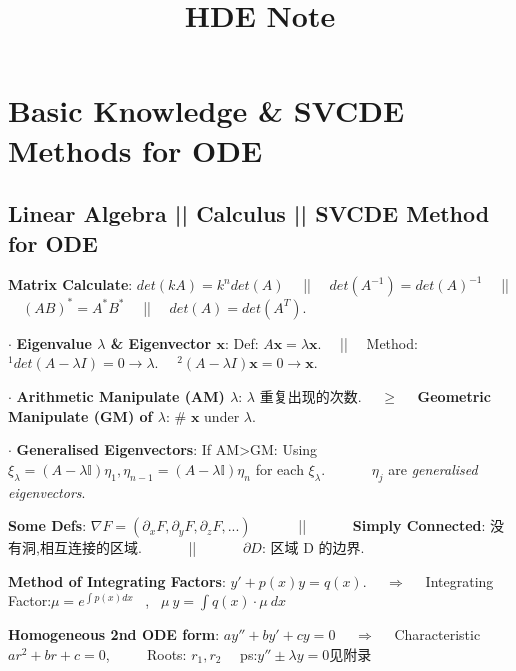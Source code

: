 \documentclass[8pt]{extarticle}
\title{HDE Note}
\author{}
\date{}
\begin{document}

\maketitle
\thispagestyle{fancy}
\vspace{-2.7cm}

\setlength{\parindent}{0pt}
\footnotesize

\section{Basic Knowledge \& SVCDE Methods for ODE}


\begin{minipage}[t]{0.6\textwidth}

\subsection{Linear Algebra || Calculus || SVCDE Method for ODE}

\textbf{Matrix Calculate}: $det(kA)=k^ndet(A)$ \ \ || \ \ $det(A^{-1})=det(A)^{-1}$ \ \ || \ \ $(AB)^*=A^*B^*$ \ \ || \ \ $det(A)=det(A^T)$.

$\cdot$ \textbf{Eigenvalue $\lambda$ \& Eigenvector $\mathbf{x}$}: Def: $A\mathbf{x}=\lambda\mathbf{x}$. \ \ || \ \ Method: $^1det(A-\lambda I)=0\to\lambda$. \ \ $^2(A-\lambda I)\mathbf{x}=0\to\mathbf{x}$.

$\cdot$ \textbf{Arithmetic Manipulate (AM) $\lambda$}: $\lambda$ 重复出现的次数. \ \ $\geq$ \ \ \textbf{Geometric Manipulate (GM) of $\lambda$}: \# $\mathbf{x}$ under $\lambda$.
    
$\cdot$ \textbf{Generalised Eigenvectors}: If AM>GM: Using $\xi_\lambda = (A-\lambda\mathbb{I})\eta_1,\eta_{n-1} = (A-\lambda\mathbb{I})\eta_{n}$ for each $\xi_\lambda$. \ \ \ \ \ \ $\eta_j$ are \textit{generalised eigenvectors}.

\textbf{Some Defs}: $\nabla F=(\partial_xF,\partial_yF,\partial_zF,...)$ \ \ \ \ \ \ || \ \ \ \ \ \ \textbf{Simply Connected}: { 没有洞,相互连接的区域}. \ \ \ \ \ \ || \ \ \ \ \ \ \textbf{$\partial D$}: { 区域 D 的边界.}

\textbf{Method of Integrating Factors}: $y'+p(x)y=q(x)$. \ \ $\Rightarrow$ \ \ Integrating Factor:$\mu=e^{\int p(x)dx}$ \ , \ $\mu \ y=\int q(x)\cdot \mu \ dx$

\textbf{Homogeneous 2nd ODE form}: $ay''+by'+cy=0$ \ \ $\Rightarrow$ \ \ Characteristic $ar^2+br+c=0$, \ \ \ \ { Roots: $r_1,r_2$} \ \ {\scriptsize ps:$y''\pm\lambda y=0$见附录}


\end{minipage}
\end{document}
